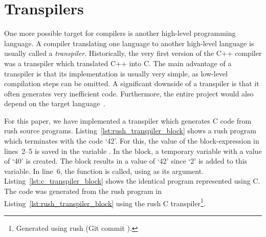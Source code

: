 \newpage
\section{Transpilers}

One more possible target for compilers is another high-level programming language.
A compiler translating one language to another high-level language is usually called a \emph{transpiler}.
Historically, the very first version of the C++ compiler was a transpiler which translated C++ into C.
The main advantage of a transpiler is that its implementation is usually very simple, as low-level compilation steps can be omitted.
A significant downside of a transpiler is that it often generates very inefficient code.
Furthermore, the entire project would also depend on the target language~\cite[p.~5]{Jeffery2021}.

For this paper, we have implemented a transpiler which generates C code from rush source programs.
Listing~\ref{lst:rush_transpiler_block} shows a rush program which terminates with the code `42'.
For this, the value of the block-expression in lines~2--5 is saved in the variable .
In the block, a temporary variable with a value of `40' is created.
The block results in a value of `42' since `2' is added to this variable.
In line~6, the  function is called, using  as its argument.
Listing~\ref{lst:c_transpiler_block} shows the identical program represented using C.
The code was generated from the rush program in Listing~\ref{lst:rush_transpiler_block} using the rush C transpiler\footnote{Generated using rush (Git commit \rushCommit{}).}.

\noindent
\begin{minipage}{.45\textwidth}
	\centering
\end{minipage}%
\hfill%
\begin{minipage}{.45\textwidth}
	\centering
	\vspace{.1cm}
\end{minipage}

